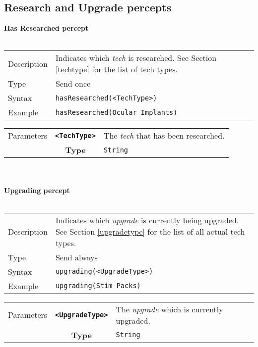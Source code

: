 \subsection{Research and Upgrade percepts}
\textbf{Has Researched percept}\\
\\
\begin{tabularx}{\textwidth}{lX}
 Description & Indicates which \textit{tech} is researched. See Section \ref{techtype} for the list of tech types. \\
 Type & Send once \\
 Syntax & \verb|hasResearched(<TechType>)| \\
 Example & \verb|hasResearched(Ocular Implants)| \\
 \end{tabularx}
 \begin{tabularx}{\textwidth}{l | c | p{8cm}|}
 \cline{2-3}
 Parameters & \textbf{\verb|<TechType>|} & The \textit{tech} that has been researched. \\
            & \textbf{Type} & \verb|String| \\
            \cline{2-3}
\end{tabularx}\\
\\
\textbf{Upgrading percept}\\
\\
\begin{tabularx}{\textwidth}{lX}
 Description & Indicates which \textit{upgrade} is currently being upgraded. See Section \ref{upgradetype} for the list of all actual tech types. \\
 Type & Send always \\
 Syntax & \verb|upgrading(<UpgradeType>)| \\
 Example & \verb|upgrading(Stim Packs)| \\
 \end{tabularx}
 \begin{tabularx}{\textwidth}{l | c | p{8cm}|}
 \cline{2-3}
 Parameters & \textbf{\verb|<UpgradeType>|} & The \textit{upgrade} which is currently upgraded. \\
            & \textbf{Type} & \verb|String| \\
            \cline{2-3}
\end{tabularx}\\
\newpage

